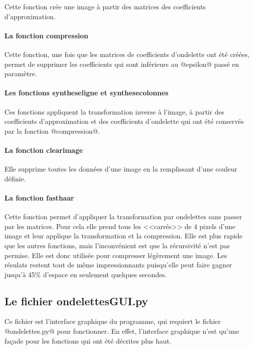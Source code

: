 \documentclass{article}
\begin{document}
Cette fonction crée une image à partir des matrices des coefficients d'approximation.

\paragraph{La fonction compression}

Cette fonction, une fois que les matrices de coefficients d'ondelette ont été créées, permet de supprimer les coefficients qui sont inférieurs au @epsilon@ passé en paramètre.

\paragraph{Les fonctions syntheseligne et synthesecolonnes}

Ces fonctions appliquent la transformation inverse à l'image, à partir des coefficients d'approximation et des coefficients d'ondelette qui ont été conservés par la fonction @compression@.

\paragraph{La fonction clearimage}

Elle supprime toutes les données d'une image en la remplissant d'une couleur définie.

\paragraph{La fonction fasthaar}

Cette fonction permet d'appliquer la transformation par ondelettes sans passer par les matrices. Pour cela elle prend tous les <<carrés>> de 4 pixels d'une image et leur applique la transformation et la compression. Elle est plus rapide que les autres fonctions, mais l'inconvénient est que la récursivité n'est pas permise. Elle est donc utilisée pour compresser légèrement une image. Les résulats restent tout de même impressionnants puisqu'elle peut faire gagner jusqu'à 45\% d'espace en seulement quelques secondes.


\subsection{Le fichier ondelettesGUI.py}

Ce fichier est l'interface graphique du programme, qui requiert le fichier @ondelettes.py@ pour fonctionner. En effet, l'interface graphique n'est qu'une façade pour les fonctions qui ont été décrites plus haut.
\end{document}
